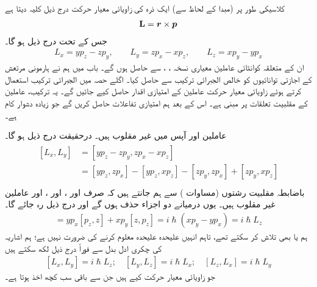  کلاسیکی طور پر (مبدا کے لحاظ سے) ایک ذرہ کی زاویائی معیار حرکت درج ذیل کلیہ دیتا ہے 
\begin{align}
\operatorname{\mathbf{L}}={{\boldsymbol{r}}}\times{\ensuremath{{\boldsymbol{p}}}}
\end{align}
جس کے تحت درج ذیل ہو گا۔
\begin{align}\label{مساوات_تین_ابعادی_متعدد_رشتے}
L_{x}=yp_{z}-zp_{y}, \quad\quad L_{y}=zp_{x}-xp_{z}, \quad \quad L_{z}=xp_{y}-yp_{x}
\end{align}
ان کے متعلقہ کوانٹائی عاملین معیاری نسخہ ، ،  سے حاصل ہوں گے۔ باب  میں ہم نے ہارمونی مرتعش کے اجازتی توانائیوں کو خالص الجبرائی ترکیب سے حاصل کیا۔ اگلے حصہ میں الجبرائی ترکیب استعمال کرتے ہوئے زاویائی معیار حرکت عاملین کے امتیازی اقدار حاصل کیے جائیں گے۔ یہ ترکیب، عاملین کے مقلبیت تعلقات پر مبنی ہے۔ اس کے بعد ہم امتیازی تفاعلات حاصل کریں گے جو زیادہ دشوار کام ہے۔

عاملین  اور  آپس میں غیر مقلوب ہیں۔ درحقیقت درج ذیل ہو گا۔
\begin{gather}
\begin{aligned}
[L_{x},L_{y}]&=[yp_{z}-zp_{y},zp_{x}-xp_{z}]\\
&=[yp_{z},zp_{x}]-[yp_{z},xp_{z}]-[zp_{y},zp_{x}]+[zp_{y},xp_{z}]\\
\end{aligned}
\end{gather}
باضابطہ مقلبیت رشتوں (مساوات ) سے ہم جانتے ہیں کہ صرف  اور ،  اور ،  اور  عاملین غیر مقلوب ہیں۔ یوں درمیانے دو اجزاء حذف ہوں گے اور درج ذیل رہ جائے گا۔
\begin{align}
[L_x, L_y] = y p_x [p_z, z] + x p_y [z, p_z] = i \hslash (x p_y - y p_x) = i \hslash L_z
\end{align}
ہم  یا  بھی تلاش کر سکتے تھے، تاہم انہیں علیحدہ علیحدہ معلوم کرنے کی ضرورت نہیں ہے؛ ہم اشاریہ کی
 چکری ادل بدل  سے فوراً درج ذیل لکھ سکتے ہیں 
\begin{align}\label{مساوات_تین_ابعادی_بنیادی_مقلبیت_رشتہ}
[L_x, L_y] = i \hslash L_z ; \quad [L_y, L_z] = i \hslash L_x ; \quad [L_z, L_x] = i \hslash L_y
\end{align}
جو زاویائی معیار حرکت کیے ہیں جن سے باقی سب کچھ اخذ ہوتا ہے۔

